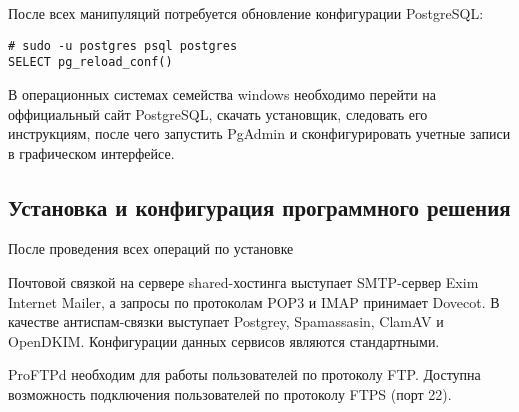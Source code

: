 После всех манипуляций потребуется обновление конфигурации PostgreSQL:
\begin{lstlisting}
# sudo -u postgres psql postgres
SELECT pg_reload_conf()
\end{lstlisting}

В операционных системах семейства windows необходимо перейти на оффициальный сайт PostgreSQL, скачать установщик, следовать его инструкциям, после чего запустить PgAdmin и сконфигурировать учетные записи в графическом интерфейсе.

\subsection{Установка и конфигурация программного решения}

После проведения всех операций по установке

Почтовой связкой на сервере shared-хостинга выступает SMTP-сервер Exim Internet Mailer, а запросы по протоколам POP3 и IMAP принимает Dovecot.
В качестве антиспам-связки выступает Postgrey, Spamassasin, ClamAV и OpenDKIM.
Конфигурации данных сервисов являются стандартными.

ProFTPd необходим для работы пользователей по протоколу FTP.
Доступна возможность подключения пользователей по протоколу FTPS (порт 22).

